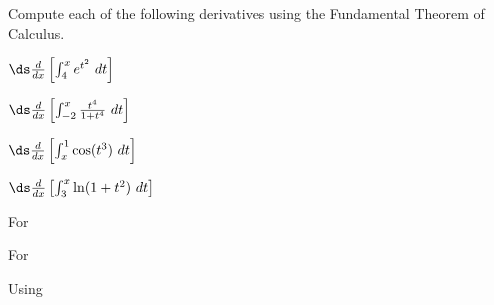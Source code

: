 \begin{activity} \label{A:5.2.3}  
Compute each of the following derivatives using the Fundamental Theorem of Calculus.
\ba
\item $\ds \frac{d}{dx} \left[ \int_4^x e^{t^2} \ dt \right]$
\item $\ds \frac{d}{dx} \left[ \int_{-2}^x \frac{t^4}{1+t^4} \ dt \right]$
\item $\ds \frac{d}{dx} \left[ \int_{x}^1 \cos(t^3) \ dt \right]$
\item $\ds \frac{d}{dx} \left[ \int_{3}^x \ln(1+t^2) \ dt \right]$
\ea
\end{activity}
\begin{smallhint}
\ba
	\item For 
\ea
\end{smallhint}
\begin{bighint}
\ba
	\item For 
\ea
\end{bighint}
\begin{activitySolution}
\ba
	\item Using 
\ea
\end{activitySolution}
\aftera